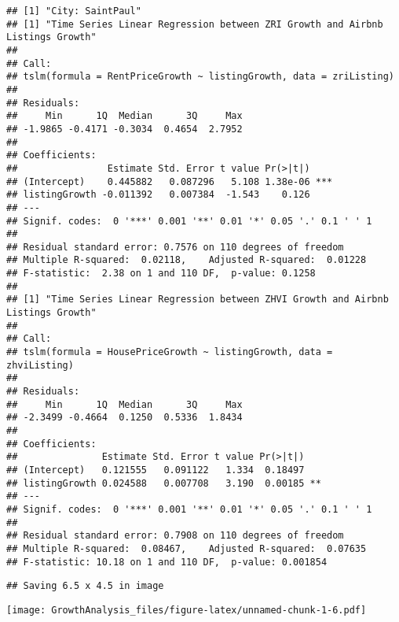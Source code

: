 \documentclass[
]{article}
\begin{document}
\begin{verbatim}
## [1] "City: SaintPaul"
## [1] "Time Series Linear Regression between ZRI Growth and Airbnb Listings Growth"
## 
## Call:
## tslm(formula = RentPriceGrowth ~ listingGrowth, data = zriListing)
## 
## Residuals:
##     Min      1Q  Median      3Q     Max 
## -1.9865 -0.4171 -0.3034  0.4654  2.7952 
## 
## Coefficients:
##                Estimate Std. Error t value Pr(>|t|)    
## (Intercept)    0.445882   0.087296   5.108 1.38e-06 ***
## listingGrowth -0.011392   0.007384  -1.543    0.126    
## ---
## Signif. codes:  0 '***' 0.001 '**' 0.01 '*' 0.05 '.' 0.1 ' ' 1
## 
## Residual standard error: 0.7576 on 110 degrees of freedom
## Multiple R-squared:  0.02118,    Adjusted R-squared:  0.01228 
## F-statistic:  2.38 on 1 and 110 DF,  p-value: 0.1258
## 
## [1] "Time Series Linear Regression between ZHVI Growth and Airbnb Listings Growth"
## 
## Call:
## tslm(formula = HousePriceGrowth ~ listingGrowth, data = zhviListing)
## 
## Residuals:
##     Min      1Q  Median      3Q     Max 
## -2.3499 -0.4664  0.1250  0.5336  1.8434 
## 
## Coefficients:
##               Estimate Std. Error t value Pr(>|t|)   
## (Intercept)   0.121555   0.091122   1.334  0.18497   
## listingGrowth 0.024588   0.007708   3.190  0.00185 **
## ---
## Signif. codes:  0 '***' 0.001 '**' 0.01 '*' 0.05 '.' 0.1 ' ' 1
## 
## Residual standard error: 0.7908 on 110 degrees of freedom
## Multiple R-squared:  0.08467,    Adjusted R-squared:  0.07635 
## F-statistic: 10.18 on 1 and 110 DF,  p-value: 0.001854
\end{verbatim}

\begin{verbatim}
## Saving 6.5 x 4.5 in image
\end{verbatim}

\texttt{[image: GrowthAnalysis\_files/figure-latex/unnamed-chunk-1-6.pdf]}
\end{document}
